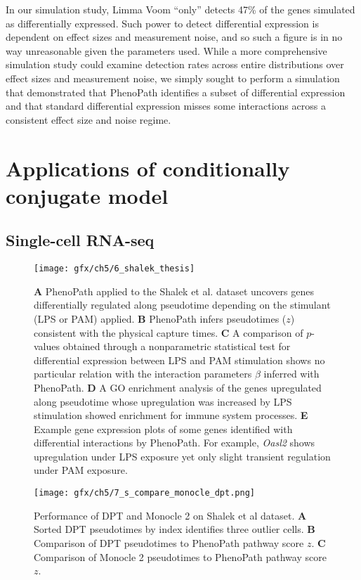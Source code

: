 In our simulation study, Limma Voom ``only'' detects 47\% of the genes simulated as differentially expressed. Such power to detect differential expression is dependent on effect sizes and measurement noise, and so such a figure is in no way unreasonable given the parameters used. While a more comprehensive simulation study could examine detection rates across entire distributions over effect sizes and measurement noise, we simply sought to perform a simulation that demonstrated that PhenoPath identifies a subset of differential expression and that standard differential expression misses some interactions across a consistent effect size and noise regime.




\section{Applications of conditionally conjugate model}

\subsection{Single-cell RNA-seq} \label{sec:shalek}

\begin{figure}
\centering
  \texttt{[image: gfx/ch5/6\_shalek\_thesis]}
  \caption{\textbf{A} PhenoPath applied to the Shalek et al. dataset uncovers genes differentially regulated along pseudotime depending on the stimulant (LPS or PAM) applied.
  \textbf{B} PhenoPath infers pseudotimes ($z$) consistent with the physical capture times.
  \textbf{C} A comparison of $p$-values obtained through a nonparametric statistical test for differential expression between LPS and PAM stimulation shows no particular relation with the interaction parameters $\beta$ inferred with PhenoPath.
  \textbf{D} A GO enrichment analysis of the genes upregulated along pseudotime whose upregulation was increased by LPS stimulation showed enrichment for immune system processes.
  \textbf{E} Example gene expression plots of some genes identified with differential interactions by PhenoPath. For example, \emph{Oasl2} shows upregulation under LPS exposure yet only slight transient regulation under PAM exposure. }  \label{fig:shalek}
\end{figure}

\begin{figure}
   \texttt{[image: gfx/ch5/7\_s\_compare\_monocle\_dpt.png]}
   \caption{Performance of DPT and Monocle 2 on Shalek et al dataset.
\textbf{A} Sorted DPT pseudotimes by index identifies three outlier cells. \textbf{B} Comparison of DPT pseudotimes to PhenoPath pathway score $z$. \textbf{C} Comparison of Monocle 2 pseudotimes to PhenoPath pathway score $z$.}
	\label{fig:shalek_comparison}
\end{figure}

